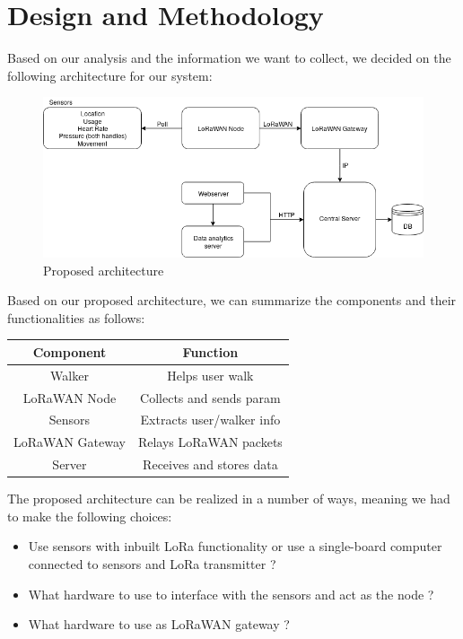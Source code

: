 \chapter{Design and Methodology}
\label{cha:design-and-method}

Based on our analysis and the information we want to collect, we decided on the following architecture for our system:
\begin{figure}[h]
\centering
\includegraphics[width=0.7\linewidth]{gfx/image1}
\caption{Proposed architecture}
\label{fig:image1}
\end{figure}

Based on our proposed architecture, we can summarize the components and their functionalities as follows:

\begin{center}
\begin{tabular}{|c|c|}
\hline
Component	& Function \\ 
\hline
Walker	&  Helps user walk\\ 
LoRaWAN Node	& Collects and sends param \\ 
Sensors		& Extracts user/walker info \\ 
LoRaWAN Gateway	& Relays LoRaWAN packets  \\ 
Server	& Receives and stores data \\
\hline

\end{tabular} 

\end{center}

The proposed architecture can be realized in a number of ways, meaning we had to make the following choices:
\begin{itemize}
	\item Use sensors with inbuilt LoRa functionality or use a single-board computer connected to sensors and LoRa transmitter ?
	\item What hardware to use to interface with the sensors and act as the node ?
	\item What hardware to use as LoRaWAN gateway ?
\end{itemize}



